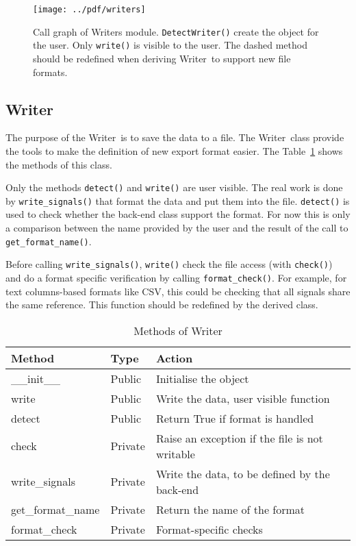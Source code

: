 \documentclass[a4paper,11pt]{article}
\newcommand{\meth}[1]{\texttt{#1()}}
\newcommand{\cls}[1]{\textsf{#1}}
\newcommand{\wrt}{\cls{Writer}}
\begin{document}
\begin{figure}[htbp]
  \centering
  \texttt{[image: ../pdf/writers]}
  \caption{Call graph of Writers module. \meth{DetectWriter} create the object for the user. Only \meth{write} is visible to the user. The dashed method should be redefined when deriving \wrt\ to support new file formats.}
  \label{fig:wrts:callgraph}
\end{figure}
\subsection{Writer}
The purpose of the \wrt\ is to save the data to a file.
The \wrt\ class provide the tools to make the definition of new export format easier.
The Table~\ref{tab:wrts:meth} shows the methods of this class.

Only the methods \meth{detect} and \meth{write} are user visible.
The real work is done by \meth{write\_signals} that format the data and put them into the file.
\meth{detect} is used to check whether the back-end class support the format.
For now this is only a comparison between the name provided by the user and the result of the call to \meth{get\_format\_name}.

Before calling \meth{write\_signals}, \meth{write} check the file access (with \meth{check}) and do a format specific verification by calling \meth{format\_check}.
For example, for text columns-based formats like CSV, this could be checking that all signals share the same reference.
This function should be redefined by the derived class.

\begin{table}[htbp]
  \centering\sf\small
  \begin{tabular}{lll}
    \hline
    Method & Type & Action \\
    \hline
    \_\_init\_\_ & Public & Initialise the object \\
    write        & Public & Write the data, user visible function\\
    detect       & Public & Return True if format is handled\\
    check        & Private& Raise an exception if the file is not writable\\
    write\_signals  & Private& Write the data, to be defined by the back-end\\
    get\_format\_name&Private& Return the name of the format\\
    format\_check   & Private& Format-specific checks\\
    \hline
  \end{tabular}
  \caption{Methods of \wrt}
  \label{tab:wrts:meth}
\end{table}
\end{document}
